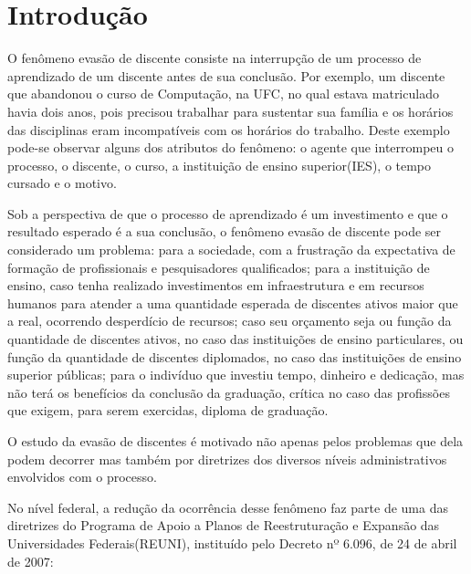 \chapter{Introdução}


O fenômeno evasão de discente consiste na interrupção de um processo de aprendizado de um discente antes de sua conclusão. Por exemplo, um discente que abandonou o curso de Computação, na UFC, no qual estava matriculado havia dois anos, pois precisou trabalhar para sustentar sua família e os horários das disciplinas eram incompatíveis com os horários do trabalho. Deste exemplo pode-se observar alguns dos atributos do fenômeno: o agente que interrompeu o processo, o discente, o curso, a instituição de ensino superior(IES), o tempo cursado e o motivo.


Sob a perspectiva de que o processo de aprendizado é um investimento e que o resultado esperado é a sua conclusão, o fenômeno evasão de discente pode ser considerado um problema: para a sociedade, com a frustração da expectativa de formação de profissionais e pesquisadores qualificados; para a instituição de ensino, caso tenha realizado investimentos em infraestrutura e em recursos humanos para atender a uma quantidade esperada de discentes ativos maior que a real, ocorrendo desperdício de recursos; caso seu orçamento seja ou função da quantidade de discentes ativos, no caso das instituições de ensino particulares, ou função da quantidade de discentes diplomados, no caso das instituições de ensino superior públicas; para o indivíduo que investiu tempo, dinheiro e dedicação, mas não terá os benefícios da conclusão da graduação, crítica no caso das profissões que exigem, para serem exercidas, diploma de graduação.


O estudo da evasão de discentes é motivado não apenas pelos problemas que dela podem decorrer mas também por diretrizes dos diversos níveis administrativos envolvidos com o processo.

No nível federal, a redução da ocorrência desse fenômeno faz parte de uma das diretrizes do Programa de Apoio a Planos de Reestruturação e Expansão das Universidades Federais(REUNI), instituído pelo Decreto nº 6.096, de 24 de abril de 2007\cite{reuni}:


